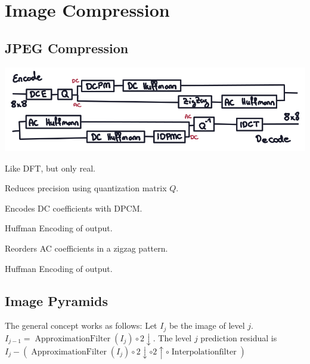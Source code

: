 \section{Image Compression}
\subsection{JPEG Compression}

\includegraphics*[width=\linewidth]{assets/jpeg.png}

\begin{definition}
  Like DFT, but only real.
\end{definition}

\begin{definition}[Quantization]
  Reduces precision using  quantization matrix \(Q\).
\end{definition}

\begin{definition}
  Encodes DC coefficients with DPCM.
\end{definition}

\begin{definition}
  Huffman Encoding of output.
\end{definition}

\begin{definition}
  Reorders AC coefficients in a zigzag pattern.
\end{definition}

\begin{definition}
  Huffman Encoding of output.
\end{definition}

\subsection{Image Pyramids}

The general concept works as follows: Let $I_j$ be the image of level $j$. $I_{j-1} = \operatorname{ApproximationFilter}(I_j) \circ 2 \downarrow$. The level $j$ prediction residual is $I_j - (\operatorname{ApproximationFilter}(I_j) \circ 2 \downarrow \circ 2 \uparrow \circ \operatorname{Interpolation filter})$

